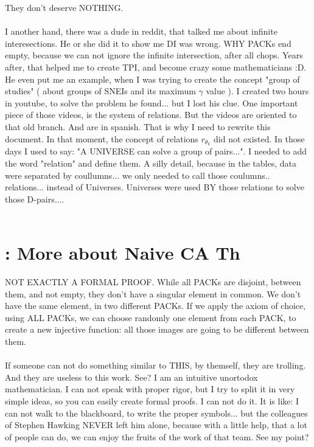 		\noindent
		They don't deserve NOTHING.
		\\\\
		
		\noindent
		I another hand, there was a dude in reddit, that talked me about infinite interesections. He or she did it to show me DI was wrong. WHY PACKs end empty, because we can not ignore the infinite intersection, after all chops. Years after, that helped me to create TPI, and become crazy some mathematicians :D. He even put me an example, when I was trying to create the concept "group of studies" ( about groups of SNEIs and its maximum $\gamma$ value ). I created two hours in youtube, to solve the problem he found... but I lost his clue. One important piece of those videos, is the system of relations. But the videos are oriented to that old branch. And are in spanish. That is why I need to rewrite this document. In that moment, the concept of relations $r_{\theta_{k}}$ did not existed. In those days I used to say: "A UNIVERSE can solve a group of pairs...". I needed to add the word "relation" and define them. A silly detail, because in the tables, data were separated by coullumns... we only needed to call those coulumns.. relations... instead of Universes. Universes were used BY those relations to solve those D-pairs....
		\\\\
	
	\section{\:: More about Naive CA Th}
	
		\noindent
		NOT EXACTLY A FORMAL PROOF. While all PACKs are disjoint, between them, and not empty, they don't have a singular element in common. We don't have the same element, in two different PACKs. If we apply the axiom of choice, using ALL PACKs, we can choose randomly one element from each PACK, to create a new injective function: all those images are going to be different between them. 
		\\\\
		
		\noindent
		If someone can not do something similar to THIS, by themself, they are trolling. And they are useless to this work. See? I am an intuitive unortodox mathematician. I can not speak with proper rigor, but I try to split it in very simple ideas, so you can easily create formal proofs. I can not do it. It is like: I can not walk to the blackboard, to write the proper symbols... but the colleagues of Stephen Hawking NEVER left him alone, because with a little help, that a lot of people can do, we can enjoy the fruits of the work of that team. See my point?
		\\\\
		

